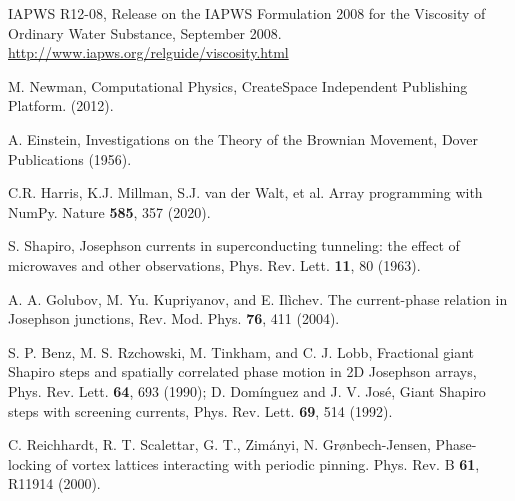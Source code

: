 \documentclass[twocolumn,showpacs,preprintnumbers,amsmath,amssymb,aps,prb]{revtex4}
\begin{document}
\begin{thebibliography}{99}
    IAPWS R12-08, 
    Release on the IAPWS Formulation 2008 for the Viscosity of Ordinary Water Substance,  September 2008.
    \url{http://www.iapws.org/relguide/viscosity.html}

   M. Newman, Computational Physics, CreateSpace Independent Publishing Platform. (2012).
      
   A. Einstein, Investigations on the Theory of the Brownian Movement,  Dover Publications (1956).

     C.R. Harris, K.J. Millman, S.J. van der Walt, et al. Array programming with NumPy. Nature {\bf 585}, 357 (2020). %
      
     S. Shapiro, Josephson currents in superconducting tunneling: the effect of microwaves and other observations, Phys. Rev. Lett. {\bf 11}, 80 (1963).

     A. A. Golubov, M. Yu. Kupriyanov, and E. Il{\`i}chev. The current-phase relation in Josephson junctions, Rev. Mod. Phys. {\bf 76}, 411 (2004).

      S. P. Benz, M. S. Rzchowski, M. Tinkham, and C. J. Lobb, Fractional giant Shapiro steps and spatially correlated phase motion in 2D Josephson arrays, Phys. Rev. Lett. {\bf 64}, 693 (1990); D. Dom{\'i}nguez and J. V. Jos{\'e}, Giant Shapiro steps with screening currents, Phys. Rev. Lett. {\bf 69}, 514 (1992).

     C. Reichhardt, R. T. Scalettar, G. T., Zim{\'a}nyi, N. Gr{\o}nbech-Jensen,  Phase-locking of vortex lattices interacting with periodic pinning.  Phys. Rev. B {\bf 61}, R11914 (2000).
     

\end{thebibliography}
      
\end{document}
